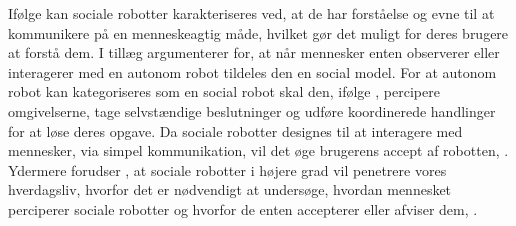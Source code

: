 Ifølge \textcite[s. 1]{PDF:SharingALifeHarvey} kan sociale robotter karakteriseres ved, at de har forståelse og evne til at kommunikere på en menneskeagtig måde, hvilket gør det muligt for deres brugere at forstå dem. I tillæg argumenterer \textcite[s. 168]{PDF:TowardSociableRobots} for, at når mennesker enten observerer eller interagerer med en autonom robot tildeles den en social model. For at autonom robot kan kategoriseres som en social robot skal den, ifølge \textcite[s. 168]{PDF:TowardSociableRobots}, percipere omgivelserne, tage selvstændige beslutninger og udføre koordinerede handlinger for at løse deres opgave. Da sociale robotter designes til at interagere med mennesker, via simpel kommunikation, vil det øge brugerens accept af robotten, \parencite[s. 1476]{PDF:ExploringInfluencingVariable}. Ydermere forudser \textcite[s. 1476]{PDF:ExploringInfluencingVariable}, at sociale robotter i højere grad vil penetrere vores hverdagsliv, hvorfor det er nødvendigt at undersøge, hvordan mennesket perciperer sociale robotter og hvorfor de enten accepterer eller afviser dem, \parencite[s. 1]{PDF:SharingALifeHarvey}.  



